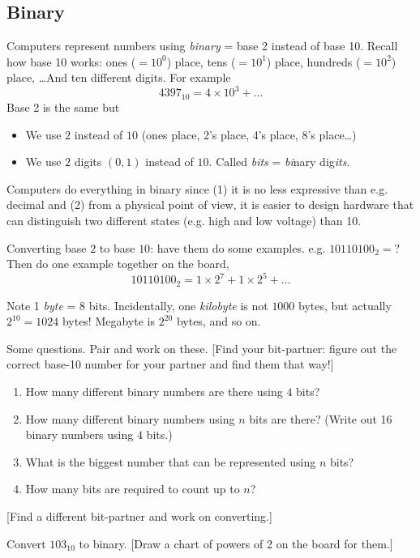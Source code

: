 \documentclass{article}
\begin{document}
\subsection*{Binary}

Computers represent numbers using \emph{binary} = base 2 instead of
base 10.  Recall how base 10 works: ones ($=10^0$) place, tens
($=10^1$) place, hundreds ($=10^2$) place, \dots  And ten different
digits.  For example \[ 4397_{10} = 4 \times 10^3 + \dots \] Base 2 is
the same but
\begin{itemize}
\item We use $2$ instead of $10$ (ones place, 2's place, 4's place,
  8's place\dots)
\item We use $2$ digits $(0,1)$ instead of $10$.  Called \emph{bits} =
  \emph{bi}nary dig\emph{its}.
\end{itemize}
Computers do everything in binary since (1) it is no less expressive
than e.g. decimal and (2) from a physical point of view, it is easier
to design hardware that can distinguish two different states
(e.g. high and low voltage) than 10.

Converting base $2$ to base $10$: have them do some
examples. e.g. $10110100_2 = ?$  Then do one example together on the
board, \[ 10110100_2 = 1 \times 2^7 + 1 \times 2^5 + \dots \]

Note 1 \emph{byte} = 8 bits.  Incidentally, one \emph{kilobyte} is not
$1000$ bytes, but actually $2^{10} = 1024$ bytes!  Megabyte is
$2^{20}$ bytes, and so on.

Some questions.  Pair and work on these. [Find your bit-partner:
figure out the correct base-10 number for your partner and find them
that way!]

\begin{enumerate}
\item How many different binary numbers are there using $4$ bits?
\item How many different binary numbers using $n$ bits are there?
  (Write out 16 binary numbers using $4$ bits.)
\item What is the biggest number that can be represented using $n$
  bits?
\item How many bits are required to count up to $n$?
\end{enumerate}

[Find a different bit-partner and work on converting.]

Convert $103_{10}$ to binary.  [Draw a chart of powers of 2 on the
board for them.]
\end{document}
